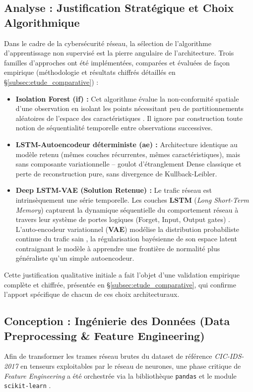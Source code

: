 \subsection{Analyse : Justification Stratégique et Choix Algorithmique}
\label{subsec:choix_algorithmique}
Dans le cadre de la cybersécurité réseau, la sélection de l'algorithme d'apprentissage non supervisé est la pierre angulaire de l'architecture. Trois familles d'approches ont été implémentées, comparées et évaluées de façon empirique (méthodologie et résultats chiffrés détaillés en \S\ref{subsec:etude_comparative}) :
\begin{itemize}
    \item \textbf{Isolation Forest (\acrshort{if}) :} Cet algorithme évalue la non-conformité spatiale d'une observation en isolant les points nécessitant peu de partitionnements aléatoires de l'espace des caractéristiques \cite{liu2008isolation}. Il ignore par construction toute notion de séquentialité temporelle entre observations successives.
    \item \textbf{LSTM-Autoencodeur déterministe (\acrshort{ae}) :} Architecture identique au modèle retenu (mêmes couches récurrentes, mêmes caractéristiques), mais sans composante variationnelle -- goulot d'étranglement Dense classique et perte de reconstruction pure, sans divergence de Kullback-Leibler.
    \item \textbf{Deep LSTM-VAE (Solution Retenue) :} Le trafic réseau est intrinsèquement une série temporelle. Les couches \textbf{LSTM} (\textit{Long Short-Term Memory}) capturent la dynamique séquentielle du comportement réseau à travers leur système de portes logiques (Forget, Input, Output gates) \cite{hochreiter1997long}. L'auto-encodeur variationnel (\textbf{VAE}) modélise la distribution probabiliste continue du trafic sain \cite{kingma2013auto}, la régularisation bayésienne de son espace latent contraignant le modèle à apprendre une frontière de normalité plus généraliste qu'un simple autoencodeur.
\end{itemize}

Cette justification qualitative initiale a fait l'objet d'une validation empirique complète et chiffrée, présentée en \S\ref{subsec:etude_comparative}, qui confirme l'apport spécifique de chacun de ces choix architecturaux.

\subsection{Conception : Ingénierie des Données (Data Preprocessing \& Feature Engineering)}
\label{subsec:feature_engineering}
Afin de transformer les trames réseau brutes du dataset de référence \textit{CIC-IDS-2017} \cite{sharafaldin2018toward} en tenseurs exploitables par le réseau de neurones, une phase critique de \textit{Feature Engineering} a été orchestrée via la bibliothèque \texttt{pandas} et le module \texttt{scikit-learn} \cite{pedregosa2011scikit}.

